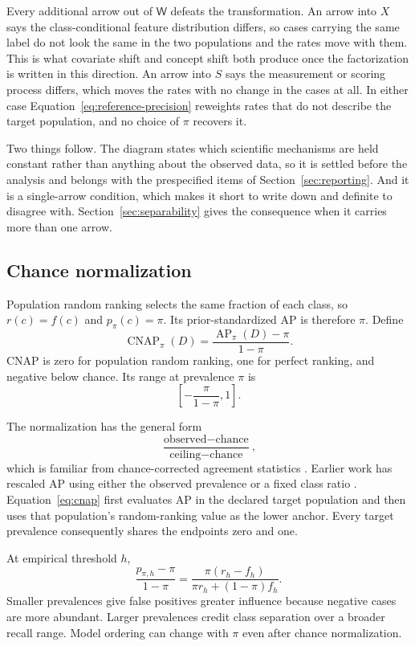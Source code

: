 \documentclass[11pt]{article}
\newcommand{\AP}{\operatorname{AP}}
\newcommand{\CNAP}{\operatorname{CNAP}}
\newcommand{\Sel}{\mathsf{W}}
\theoremstyle{remark}
\begin{document}
Every additional arrow out of $\Sel$ defeats the transformation. An arrow into $X$ says the class-conditional feature distribution differs, so cases carrying the same label do not look the same in the two populations and the rates move with them. This is what covariate shift and concept shift both produce once the factorization is written in this direction. An arrow into $S$ says the measurement or scoring process differs, which moves the rates with no change in the cases at all. In either case Equation~\eqref{eq:reference-precision} reweights rates that do not describe the target population, and no choice of $\pi$ recovers it.

Two things follow. The diagram states which scientific mechanisms are held constant rather than anything about the observed data, so it is settled before the analysis and belongs with the prespecified items of Section~\ref{sec:reporting}. And it is a single-arrow condition, which makes it short to write down and definite to disagree with. Section~\ref{sec:separability} gives the consequence when it carries more than one arrow.

\subsection{Chance normalization}

Population random ranking selects the same fraction of each class, so $r(c)=f(c)$ and $p_\pi(c)=\pi$. Its prior-standardized AP is therefore $\pi$. Define
\begin{equation}
\CNAP_\pi(D)
=
\frac{\AP_\pi(D)-\pi}{1-\pi}.
\label{eq:cnap}
\end{equation}
CNAP is zero for population random ranking, one for perfect ranking, and negative below chance. Its range at prevalence $\pi$ is
\[
\left[-\frac{\pi}{1-\pi},1\right].
\]

The normalization has the general form
\[
\frac{\text{observed}-\text{chance}}
{\text{ceiling}-\text{chance}},
\]
which is familiar from chance-corrected agreement statistics \cite{cohen1960coefficient}. Earlier work has rescaled AP using either the observed prevalence or a fixed class ratio \cite{suyuan2015relationship,bestgen2021fisher}. Equation~\eqref{eq:cnap} first evaluates AP in the declared target population and then uses that population's random-ranking value as the lower anchor. Every target prevalence consequently shares the endpoints zero and one.

At empirical threshold $h$,
\begin{equation}
\frac{p_{\pi,h}-\pi}{1-\pi}
=
\frac{\pi(r_h-f_h)}
{\pi r_h+(1-\pi)f_h}.
\label{eq:threshold-cnap}
\end{equation}
Smaller prevalences give false positives greater influence because negative cases are more abundant. Larger prevalences credit class separation over a broader recall range. Model ordering can change with $\pi$ even after chance normalization.
\end{document}
